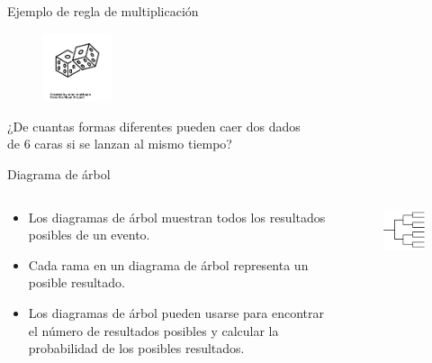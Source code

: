 \documentclass{beamer}
\begin{document}
\begin{frame}{Ejemplo de regla de multiplicaci\'on}
  \transdissolve

  \begin{exampleblock}{}
    \begin{figure}
      \raggedleft
      \includegraphics[width=2cm,angle=0,trim={1mm 210mm 1mm 200mm},clip]{figures/dice-roll.png}
    \end{figure}

    {¿De cuantas formas diferentes pueden caer dos dados \\
    de 6 caras si se lanzan al mismo tiempo?}
  \end{exampleblock}

    \vfill
    \vfill
    \vfill
    \vfill
  
\end{frame}

\begin{frame}{Diagrama de \'arbol}
  \begin{columns}
      \begin{block}{}
        \begin{itemize}
           \item Los diagramas de \'arbol muestran todos los resultados posibles de un
          evento.
           \item Cada rama en un diagrama de \'arbol representa un posible resultado. 
           \item Los diagramas de \'arbol pueden usarse para encontrar el n\'umero de
          resultados posibles y calcular la probabilidad de los posibles resultados.
        \end{itemize}
      \end{block}

      \begin{figure}
        \centering
        \includegraphics[width=3cm]{figures/tree.png}
      \end{figure}
  \end{columns}
\end{frame}
\end{document}
